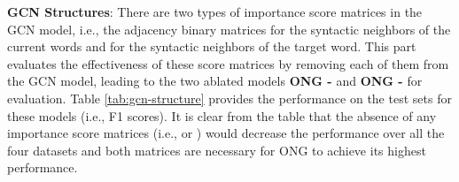 \documentclass[11pt,a4paper]{article}
\begin{document}
{\bf GCN Structures}: There are two types of importance score matrices in the GCN model, i.e., the adjacency binary matrices  for the syntactic neighbors of the current words and  for the syntactic neighbors of the target word. This part evaluates the effectiveness of these score matrices by removing each of them from the GCN model, leading to the two ablated models {\bf ONG - } and {\bf ONG - } for evaluation. Table \ref{tab:gcn-structure} provides the performance on the test sets for these models (i.e., F1 scores). It is clear from the table that the absence of any importance score matrices (i.e.,  or ) would decrease the performance over all the four datasets and both matrices are necessary for ONG to achieve its highest performance.
\begin{table}[ht]
\centering
    \caption{Ablation study on the GCN structures.}
    \label{tab:gcn-structure}
\end{table}
\end{document}
